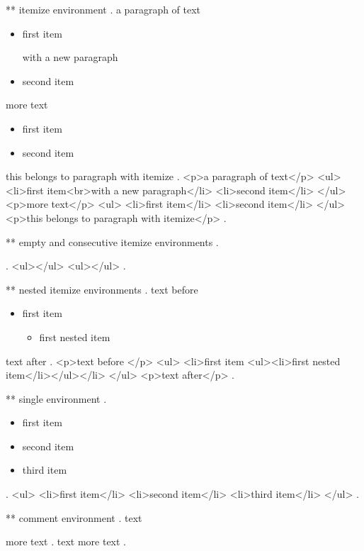 ** itemize environment
.
a paragraph of text

\begin{itemize}
    \item first item

        with a new paragraph
    \item second item
\end{itemize}

more text

\begin{itemize}
    \item first item
    \item second item
\end{itemize}
this belongs to paragraph with itemize
.
<p>a paragraph of text</p>
<ul>
<li>ﬁrst item<br>with a new paragraph</li>
<li>second item</li>
</ul>
<p>more text</p>
<ul>
<li>ﬁrst item</li>
<li>second item</li>
</ul>
<p>this belongs to paragraph with itemize</p>
.


** empty and consecutive itemize environments
.
\begin{itemize}
\end{itemize}
\begin{itemize}
\end{itemize}
.
<ul></ul>
<ul></ul>
.


** nested itemize environments
.
text before
\begin{itemize}
    \item first item
    \begin{itemize}
        \item first nested item
    \end{itemize}
\end{itemize}
text after
.
<p>text before </p>
<ul>
<li>ﬁrst item <ul><li>ﬁrst nested item</li></ul></li>
</ul>
<p>text after</p>
.


** single environment
.
\begin{itemize}
    \item first item
    \item second item
    \item third item
\end{itemize}
.
<ul>
<li>ﬁrst item</li>
<li>second item</li>
<li>third item</li>
</ul>
.


** comment environment
.
text
\begin{comment}
    This is a comment.
\end{comment}
more text
.
text
more text
.